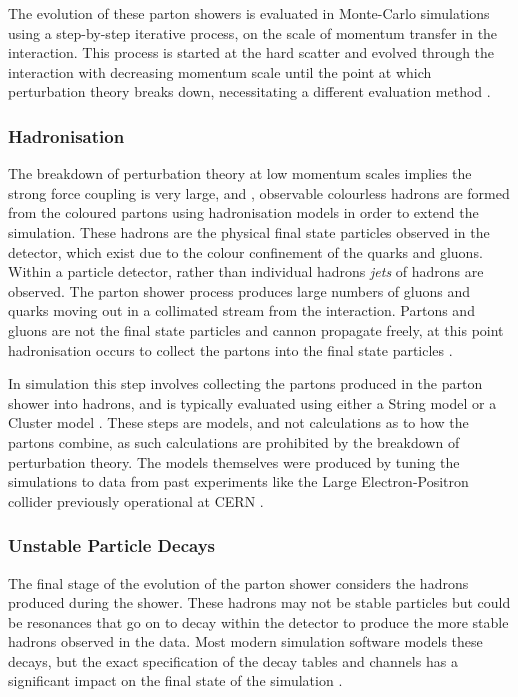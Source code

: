 			The evolution of these parton showers is evaluated in Monte-Carlo simulations using a step-by-step iterative process, on the scale of momentum transfer in the interaction. This process is started at the hard scatter and evolved through the interaction with decreasing momentum scale until the point at which perturbation theory breaks down, necessitating a different evaluation method \cite{monte-carlo}.

		\subsubsection{Hadronisation}
		\label{t:hadronisation}

			The breakdown of perturbation theory at low momentum scales implies the strong force coupling is very large, and ,  observable colourless hadrons are formed from the coloured partons using hadronisation models in order to extend the simulation. These hadrons are the physical final state particles observed in the detector, which exist due to the colour confinement of the quarks and gluons. Within a particle detector, rather than individual hadrons \textit{jets} of hadrons are observed. The parton shower process produces large numbers of gluons and quarks moving out in a collimated stream from the interaction. Partons and gluons are not the final state particles and cannon propagate freely, at this point hadronisation occurs to collect the partons into the final state particles \cite{monte-carlo}.

			In simulation this step involves collecting the partons produced in the parton shower into hadrons, and is typically evaluated using either a String model \cite{stringmodel} or a Cluster model \cite{clustermodel} \cite{monte-carlo}. These steps are models, and not calculations as to how the partons combine, as such calculations are prohibited by the breakdown of perturbation theory. The models themselves were produced by tuning the simulations to data from past experiments like the Large Electron-Positron collider previously operational at CERN \cite{tunes}.

		\subsubsection{Unstable Particle Decays}

			The final stage of the evolution of the parton shower considers the hadrons produced during the shower. These hadrons may not be stable particles but could be resonances that go on to decay within the detector to produce the more stable hadrons observed in the data. Most modern simulation software models these decays, but the exact specification of the decay tables and channels has a significant impact on the final state of the simulation \cite{monte-carlo}.

